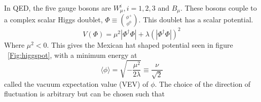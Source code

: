 \indent In QED, the five gauge bosons are ${W^{i}_{\mu}, i = 1,2,3}$ and ${B_{\mu}}$. These bosons couple to a complex scalar Higgs doublet, ${\Phi \equiv \binom{\phi^{+}}{\phi^{0}}}$. This doublet has a scalar potential.
\begin{equation}
V(\Phi) = \mu^{2}|\Phi^{\dagger}\Phi| + \lambda(|\Phi^{\dagger}\Phi|)^{2}
\end{equation}
Where ${\mu^{2} < 0}$. This gives the Mexican hat shaped potential seen in figure ~\ref{Fig:higgspot}, with a minimum energy at 
\begin{equation}
\langle \phi \rangle = \sqrt{-\frac{\mu^{2}}{2\lambda}}\equiv \frac{\nu}{\sqrt{2}}
\end{equation}
called the vacuum expectation value (VEV) of ${\phi}$. The choice of the direction of fluctuation is arbitrary but can be chosen such that


